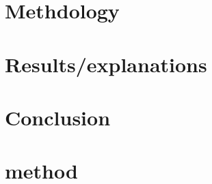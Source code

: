 \documentclass[10pt,a4paper]{article}
\begin{document}
\section{Methdology}


\section{Results/explanations}

\section{Conclusion}












\section{method}

\printbibliography
\end{document}
